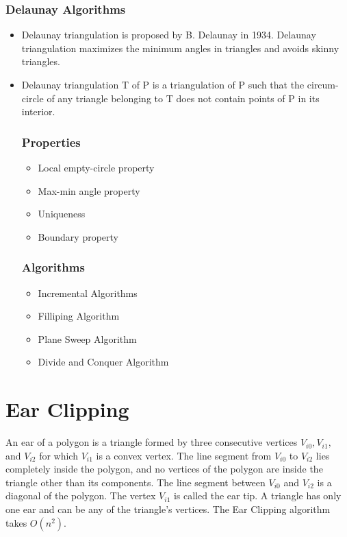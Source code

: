 \documentclass[conference]{IEEEtran}
\begin{document}
    \subsubsection{\textbf{Delaunay Algorithms}}
    \begin{itemize}
        \item Delaunay triangulation is proposed by B. Delaunay in 1934. Delaunay triangulation maximizes the minimum angles in triangles and avoids skinny triangles.
        \item Delaunay triangulation T of P is a triangulation of P such that the circum-circle of any triangle belonging to T does not contain points of P in its interior.
        \subsubsection{Properties}
        \begin{itemize}
            \item Local empty-circle property
            \item Max-min angle property
            \item Uniqueness
            \item Boundary property
        \end{itemize}
        \subsubsection{Algorithms}
        \begin{itemize}
            \item Incremental Algorithms
            \item Filliping Algorithm
            \item Plane Sweep Algorithm
            \item Divide and Conquer Algorithm
        \end{itemize}
    \end{itemize}
\section{Ear Clipping}
An ear of a polygon is a triangle formed by three consecutive vertices $V_{i0},V_{i1},$ and $V_{i2}$ for which $V_{i1}$ is a convex vertex. The line segment from $V_{i0}$ to $V_{i2}$ lies completely inside the polygon, and no vertices of the polygon are inside the triangle other than its components. The line segment between $V_{i0}$ and $V_{i2}$ is a diagonal of the polygon. The vertex $V_{i1}$ is called the ear tip. A triangle has only one ear and can be any of the triangle's vertices. The Ear Clipping algorithm takes $O(n^2)$.
\end{document}
